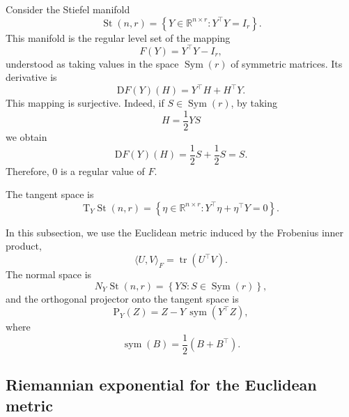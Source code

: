 \documentclass[11pt]{article}
\newcommand{\R}{\mathbb{R}}
\newcommand{\T}{\mathrm{T}}
\newcommand{\D}{\mathrm{D}}
\newcommand{\Proj}{\mathrm{P}}
\begin{document}
Consider the Stiefel manifold
\[
    \operatorname{St}(n,r)
    =
    \left\{
        Y\in\R^{n\times r}:
        Y^\top Y=I_r
    \right\}.
\]
This manifold is the regular level set of the mapping
\[
    F(Y)=Y^\top Y-I_r,
\]
understood as taking values in the space
$\operatorname{Sym}(r)$ of symmetric matrices. Its derivative is
\begin{equation}\label{eq:DF_stiefel}
    \D F(Y)(H)
    =
    Y^\top H+H^\top Y.
\end{equation}
This mapping is surjective. Indeed, if
$S\in\operatorname{Sym}(r)$, by taking
\[
    H=\frac12YS
\]
we obtain
\[
    \D F(Y)(H)
    =
    \frac12S+\frac12S
    =
    S.
\]
Therefore, $0$ is a regular value of $F$.

The tangent space is
\begin{equation}\label{eq:tangent_stiefel}
    \T_Y\operatorname{St}(n,r)
    =
    \left\{
        \eta\in\R^{n\times r}:
        Y^\top\eta+\eta^\top Y=0
    \right\}.
\end{equation}

In this subsection, we use the Euclidean metric induced by the
Frobenius inner product,
\[
    \langle U,V\rangle_F
    =
    \operatorname{tr}(U^\top V).
\]
The normal space is
\[
    N_Y\operatorname{St}(n,r)
    =
    \left\{
        YS:
        S\in\operatorname{Sym}(r)
    \right\},
\]
and the orthogonal projector onto the tangent space is
\begin{equation}\label{eq:projector_stiefel}
    \Proj_Y(Z)
    =
    Z-Y\,\operatorname{sym}(Y^\top Z),
\end{equation}
where
\[
    \operatorname{sym}(B)
    =
    \frac12(B+B^\top).
\]

\subsection*{Riemannian exponential for the Euclidean metric}
\end{document}
